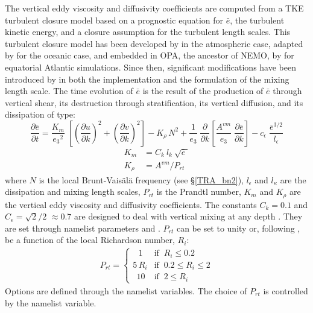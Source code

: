 The vertical eddy viscosity and diffusivity coefficients are computed from a TKE 
turbulent closure model based on a prognostic equation for $\bar{e}$, the turbulent 
kinetic energy, and a closure assumption for the turbulent length scales. This 
turbulent closure model has been developed by \citet{Bougeault1989} in the 
atmospheric case, adapted by \citet{Gaspar1990} for the oceanic case, and 
embedded in OPA, the ancestor of NEMO, by \citet{Blanke1993} for equatorial Atlantic 
simulations. Since then, significant modifications have been introduced by 
\citet{Madec1998} in both the implementation and the formulation of the mixing 
length scale. The time evolution of $\bar{e}$ is the result of the production of 
$\bar{e}$ through vertical shear, its destruction through stratification, its vertical 
diffusion, and its dissipation of \citet{Kolmogorov1942} type:
\begin{equation} \label{Eq_zdftke_e}
\frac{\partial \bar{e}}{\partial t} = 
\frac{K_m}{{e_3}^2 }\;\left[ {\left( {\frac{\partial u}{\partial k}} \right)^2
				        +\left( {\frac{\partial v}{\partial k}} \right)^2} \right]
-K_\rho\,N^2
+\frac{1}{e_3}	\;\frac{\partial }{\partial k}\left[ {\frac{A^{vm}}{e_3 }
				\;\frac{\partial \bar{e}}{\partial k}} \right]
- c_\epsilon \;\frac{\bar {e}^{3/2}}{l_\epsilon }
\end{equation}
\begin{equation} \label{Eq_zdftke_kz}
   \begin{split}
         K_m &= C_k\  l_k\  \sqrt {\bar{e}\; }  	\\
         K_\rho &= A^{vm} / P_{rt}
   \end{split}
\end{equation}
where $N$ is the local Brunt-Vais\"{a}l\"{a} frequency (see \S\ref{TRA_bn2}), 
$l_{\epsilon }$ and $l_{\kappa }$ are the dissipation and mixing length scales, 
$P_{rt}$ is the Prandtl number, $K_m$ and $K_\rho$ are the vertical eddy viscosity 
and diffusivity coefficients. The constants $C_k =  0.1$ and $C_\epsilon = \sqrt {2} /2$  
$\approx 0.7$ are designed to deal with vertical mixing at any depth \citep{Gaspar1990}. 
They are set through namelist parameters  and . 
$P_{rt}$ can be set to unity or, following \citet{Blanke1993}, be a function 
of the local Richardson number, $R_i$:
\begin{align*} \label{Eq_prt}
P_{rt} = \begin{cases}
                    \ \ \ 1 &      \text{if $\ R_i \leq 0.2$} 	\\
                    5\,R_i &      \text{if $\ 0.2 \leq R_i \leq 2$} 	\\
                    \ \ 10 &      \text{if $\ 2 \leq R_i$} 
            \end{cases}
\end{align*}
Options are defined through the   namelist variables.
The choice of $P_{rt}$ is controlled by the  namelist variable.

